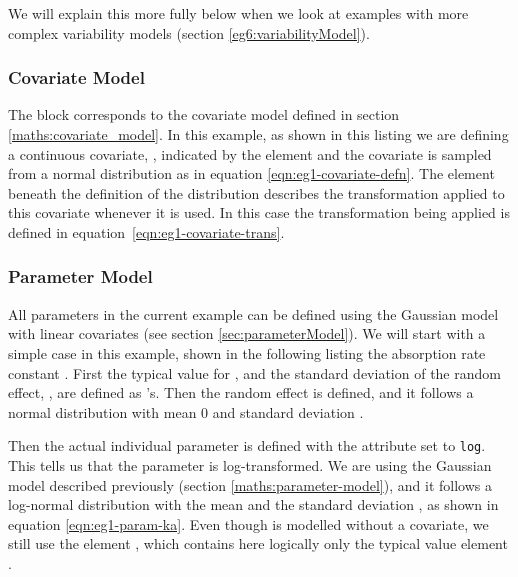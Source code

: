 We will explain this more fully below when we look at
examples with more complex variability models (section
\ref{eg6:variabilityModel}).

\subsubsection{Covariate Model}
\label{sec:eg1-covariate}


The  block corresponds to the covariate model
defined in section \ref{maths:covariate_model}. In this example, as shown
in this listing 
we are defining a continuous
covariate, , indicated by the  element and
the covariate is sampled from a normal distribution as in equation
\ref{eqn:eg1-covariate-defn}.  The element 
beneath the definition of the distribution describes the
transformation applied to this covariate whenever it is used. In this
case the transformation being applied is defined in
equation~\ref{eqn:eg1-covariate-trans}.




\subsubsection{Parameter Model}
\label{sec:eg1-pk}
All parameters in the current example  can be defined
using the Gaussian model with linear covariates (see section
\ref{sec:parameterModel}). We will start with a simple case in this
example, shown in the following listing 
the absorption rate constant . 
First the typical value for , 
and the standard deviation of the random effect, , are
defined as 's. Then the random effect 
is defined, and it follows a normal distribution with mean $0$ and
standard deviation .

Then the actual individual parameter  is
defined with the  attribute set to
\texttt{log}. This tells us that the parameter is log-transformed. We
are using the Gaussian model described previously (section
\ref{maths:parameter-model}), and it follows a log-normal distribution
with the mean  and the standard deviation
 , as shown in equation \ref{eqn:eg1-param-ka}.
Even though  is modelled without a covariate, we still use the
element , which contains here logically only the
typical value element .

